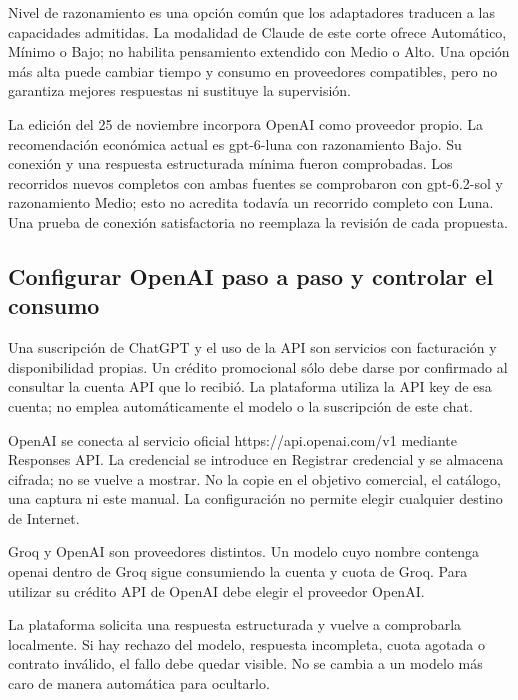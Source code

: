 Nivel de razonamiento es una opción común que los adaptadores traducen a las capacidades admitidas. La modalidad de Claude de este corte ofrece Automático, Mínimo o Bajo; no habilita pensamiento extendido con Medio o Alto. Una opción más alta puede cambiar tiempo y consumo en proveedores compatibles, pero no garantiza mejores respuestas ni sustituye la supervisión.

La edición del 25 de noviembre incorpora OpenAI como proveedor propio. La recomendación económica actual es gpt-6-luna con razonamiento Bajo. Su conexión y una respuesta estructurada mínima fueron comprobadas. Los recorridos nuevos completos con ambas fuentes se comprobaron con gpt-6.2-sol y razonamiento Medio; esto no acredita todavía un recorrido completo con Luna. Una prueba de conexión satisfactoria no reemplaza la revisión de cada propuesta.

\subsection{Configurar OpenAI paso a paso y controlar el consumo}
Una suscripción de ChatGPT y el uso de la API son servicios con facturación y disponibilidad propias. Un crédito promocional sólo debe darse por confirmado al consultar la cuenta API que lo recibió. La plataforma utiliza la API key de esa cuenta; no emplea automáticamente el modelo o la suscripción de este chat.

OpenAI se conecta al servicio oficial https://api.openai.com/v1 mediante Responses API. La credencial se introduce en Registrar credencial y se almacena cifrada; no se vuelve a mostrar. No la copie en el objetivo comercial, el catálogo, una captura ni este manual. La configuración no permite elegir cualquier destino de Internet.

Groq y OpenAI son proveedores distintos. Un modelo cuyo nombre contenga openai dentro de Groq sigue consumiendo la cuenta y cuota de Groq. Para utilizar su crédito API de OpenAI debe elegir el proveedor OpenAI.

La plataforma solicita una respuesta estructurada y vuelve a comprobarla localmente. Si hay rechazo del modelo, respuesta incompleta, cuota agotada o contrato inválido, el fallo debe quedar visible. No se cambia a un modelo más caro de manera automática para ocultarlo.

